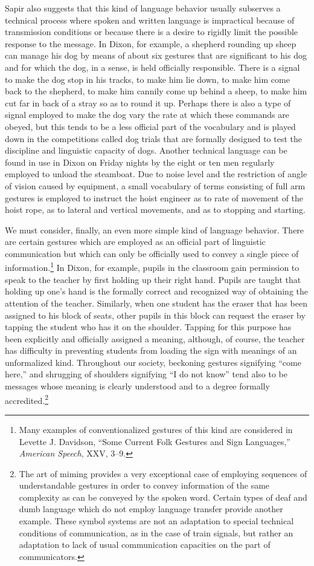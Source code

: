 \documentclass[twoside,symmetric,nobib,justified]{tufte-book}
\begin{document}
\noindent Sapir also suggests that this kind of language behavior usually
subserves a technical process where spoken and written language is
impractical because of transmission conditions or because there is a
desire to rigidly limit the possible response to the message. In Dixon,
for example, a shepherd rounding up sheep can manage his dog by means of
about six gestures that are significant to his dog and for which the
dog, in a sense, is held officially responsible. There is a signal to
make the dog stop in his tracks, to make him lie down, to make him come
back to the shepherd, to make him cannily come up behind a sheep, to
make him cut far in back of a stray so as to round it up. Perhaps there
is also a type of signal employed to make the dog vary the rate at which
these commands are obeyed, but this tends to be a less official part of
the vocabulary and is played down in the competitions called dog trials
that are formally designed to test the discipline and linguistic
capacity of dogs. Another technical language can be found in use in
Dixon on Friday nights by the eight or ten men regularly employed to
unload the steamboat. Due to noise level and the restriction of angle of
vision caused by equipment, a small vocabulary of terms consisting of
full arm gestures is employed to instruct the hoist engineer as to rate
of movement of the hoist rope, as to lateral and vertical movements, and
as to stopping and starting.

We must consider, finally, an even more simple kind of language
behavior. There are certain gestures which are employed as an official
part of linguistic communication but which can only be officially used
to convey a single piece of information.\footnote{Many examples of
  conventionalized gestures of this kind are considered in Levette J.
  Davidson, ``Some Current Folk Gestures and Sign Languages,''
  \emph{American Speech}, XXV, 3--9.} In Dixon, for example, pupils in
the classroom gain permission to speak to the teacher by first holding
up their right hand. Pupils are taught that holding up one's hand is the
formally correct and recognized way of obtaining the attention of the
teacher. Similarly, when one student has the eraser that has been
assigned to his block of seats, other pupils in this block can request
the eraser by tapping the student who has it on the shoulder. Tapping
for this purpose has been explicitly and officially assigned a meaning,
although, of course, the teacher has difficulty in preventing students
from loading the sign with meanings of an unformalized kind. Throughout
our society, beckoning gestures signifying ``come here,'' and shrugging
of shoulders signifying ``I do not know'' tend also to be messages whose
meaning is clearly understood and to a degree formally
accredited.\footnote{The art of miming provides a very exceptional case
  of employing sequences of understandable gestures in order to convey
  information of the same complexity as can be conveyed by the spoken
  word. Certain types of deaf and dumb language which do not employ
  language transfer provide another example. These symbol systems are
  not an adaptation to special technical conditions of communication, as
  in the case of train signals, but rather an adaptation to lack of
  usual communication capacities on the part of communicators.}
\end{document}

